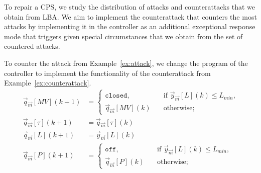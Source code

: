 {To repair a CPS, we study the distribution of attacks and counterattacks that we obtain from LBA. We aim to implement the counterattack that counters the most attacks by implementing it in the controller as an additional exceptional response mode that triggers given special circumstances that we obtain from the set of countered attacks. 
\begin{example}
  To counter the attack from Example~\ref{ex:attack}, we change the program of the controller to implement the functionality of the counterattack from Example~\ref{ex:counterattack}.
\begin{align}
  \label{eq:ControllerStage3Repair}
  \vec{q}_{\vec{m}}[MV](k+1)&=
  \begin{cases}
    \texttt{closed},&\quad \text{if $\vec{y}_{\vec{m}}[L](k)\leq L_{min}$,}\\
    \vec{q}_{\vec{m}}[MV](k)&\quad \text{otherwise;}    
  \end{cases}\\
  \vec{q}_{\vec{m}}[\tau](k+1)&=\vec{q}_{\vec{m}}[\tau](k)\\
\vec{q}_{\vec{m}}[L](k+1)&=\vec{y}_{\vec{m}}[L](k)\\
\vec{q}_{\vec{m}}[P](k+1)&=\begin{cases}
  \texttt{off},&\quad \text{if $\vec{y}_{\vec{m}}[L](k)\leq L_{min}$,}\\
  \vec{q}_{\vec{m}}[P](k)&\quad \text{otherwise;}    
\end{cases}
\end{align}
\end{example}


 
}
